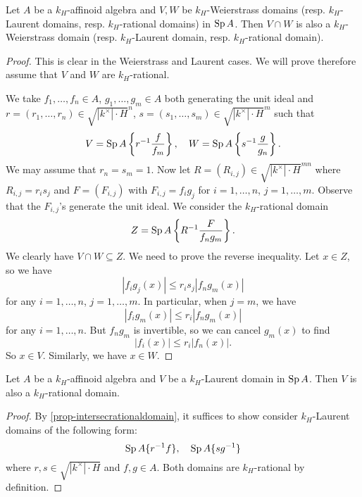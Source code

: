 \begin{proposition}\label{prop-intersecrationaldomain}
    Let $A$ be a $k_H$-affinoid algebra and $V,W$ be $k_H$-Weierstrass domains (resp. $k_H$-Laurent domains, resp. $k_H$-rational domains) in $\operatorname{Sp} A$. Then $V\cap W$ is also a $k_H$-Weierstrass domain (resp. $k_H$-Laurent domain, resp. $k_H$-rational domain).
\end{proposition}
\begin{proof}
    This is clear in the Weierstrass and Laurent cases. We will prove therefore assume that $V$ and $W$ are $k_H$-rational.

    We take $f_1,\ldots,f_n\in A$, $g_1,\ldots,g_m\in A$ both generating the unit ideal and $r=(r_1,\ldots,r_n)\in \sqrt{|k^{\times}|\cdot H}^n$, $s=(s_1,\ldots,s_m)\in \sqrt{|k^{\times}|\cdot H}^m$ such that
    \[
        V=\operatorname{Sp} A\left\{r^{-1}\frac{f}{f_m}\right\},\quad  W=\operatorname{Sp} A\left\{s^{-1}\frac{g}{g_n}\right\}.
    \]
    We may assume that $r_n=s_m=1$.
    Now let $R=(R_{i,j})\in \sqrt{|k^{\times}|\cdot H}^{mn}$ where $R_{i,j}=r_is_j$ and $F=(F_{i,j})$ with $F_{i,j}=f_ig_j$ for $i=1,\ldots,n$, $j=1,\ldots,m$. Observe that the $F_{i,j}$'s generate the unit ideal.
    We consider the $k_H$-rational domain
    \[
        Z= \operatorname{Sp} A\left\{R^{-1}\frac{F}{f_ng_m} \right\}.
    \]
    We clearly have $V\cap W\subseteq Z$. We need to prove the reverse inequality. Let $x\in Z$, so we have
    \[
        |f_ig_j(x)|\leq r_{i}s_j |f_n g_m(x)|
    \]
    for any $i=1,\ldots,n$, $j=1,\ldots,m$. In particular, when $j=m$, we have
    \[
        |f_ig_m(x)|\leq r_{i} |f_n g_m(x)|
    \]
    for any $i=1,\ldots,n$. But $f_ng_m$ is invertible, so we can cancel $g_m(x)$ to find
    \[
        |f_i(x)|\leq  r_i |f_n(x)|.
    \]
    So $x\in V$. Similarly, we have $x\in W$.
\end{proof}


\begin{corollary}\label{cor-Laurentdomainrational}
    Let $A$ be a $k_H$-affinoid algebra and $V$ be a $k_H$-Laurent domain in $\operatorname{Sp} A$. Then $V$ is also a $k_H$-rational domain.
\end{corollary}
\begin{proof}
    By \cref{prop-intersecrationaldomain}, it suffices to show consider $k_H$-Laurent domains of the following form:
    \[
        \operatorname{Sp} A\{r^{-1}f\},\quad \operatorname{Sp} A\{sg^{-1}\}  
    \]   
    where $r,s\in \sqrt{|k^{\times}|\cdot H}$ and $f,g\in A$. Both domains are $k_H$-rational by definition.
\end{proof}

